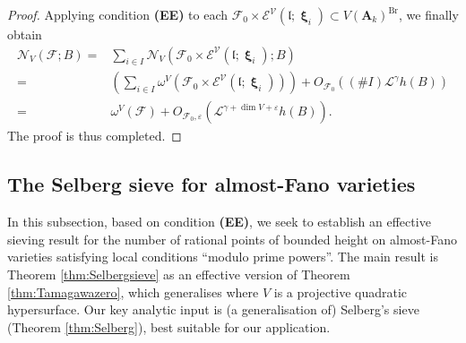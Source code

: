 \documentclass[11pt,letterpaper]{amsart}
\newcommand{\CE}{{\mathcal {E}}}
\newcommand{\CF}{{\mathcal {F}}}
\newcommand{\CL}{{\mathcal {L}}}
\newcommand{\CN}{{\mathcal {N}}}
\newcommand{\CV}{{\mathcal {V}}}
\newcommand{\RA}{{\mathbf {A}}}
\DeclareMathOperator{\bxi}{\mathbf{\xi}}
\theoremstyle{plain}
\numberwithin{equation}{section}
\theoremstyle{definition}
\theoremstyle{remark}
\begin{document}
\begin{proof}
	Applying condition \textbf{(EE)} to each $\CF_0\times\CE^\CV(\mathfrak{l};\bxi_i)\subset V(\RA_k)^{\operatorname{Br}}$, we finally obtain \begin{align*}
		\CN_V(\CF;B)=&\sum_{i\in I}\CN_V(\CF_0\times\CE^\CV(\mathfrak{l};\bxi_i);B)\\ =&\left(\sum_{i\in I}\omega^V(\CF_0\times\CE^\CV(\mathfrak{l};\bxi_i))\right)+O_{\CF_0}\left((\# I)\CL^\gamma h(B)\right)\\ =&\omega^V(\CF)+O_{\CF_0,\varepsilon}(\CL^{\gamma+\dim V+\varepsilon} h(B)).
	\end{align*}
	The proof is thus completed.
\end{proof}


\subsection{The Selberg sieve for almost-Fano varieties}\label{se:Selbersieve}
In this subsection, based on condition \textbf{(EE)}, we seek to establish an effective sieving result for the number of rational points of bounded height on almost-Fano varieties satisfying local conditions ``modulo prime powers''. The main result is Theorem \ref{thm:Selbergsieve}  as an effective version of Theorem \ref{thm:Tamagawazero}, which generalises \cite[Theorem 1.7]{Browning-Loughran} where $V$ is a projective quadratic hypersurface. Our key analytic input is (a generalisation of) Selberg's sieve (Theorem \ref{thm:Selberg}), best suitable for our application. 
\end{document}

